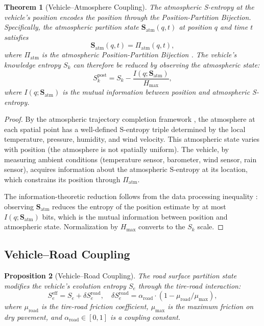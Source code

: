 \documentclass[twocolumn,10pt]{article}
\newtheorem{theorem}{Theorem}[section]
\newtheorem{proposition}[theorem]{Proposition}
\newcommand{\Sk}{S_k}
\newcommand{\Se}{S_e}
\newcommand{\Hmax}{H_{\mathrm{max}}}
\begin{document}
\begin{theorem}[Vehicle--Atmosphere Coupling]\label{thm:atmosphere}
The atmospheric S-entropy at the vehicle's position encodes the position through the Position-Partition Bijection. Specifically, the atmospheric partition state $\mathbf{S}_{\mathrm{atm}}(q, t)$ at position $q$ and time $t$ satisfies
\begin{equation}
\mathbf{S}_{\mathrm{atm}}(q, t) = \Pi_{\mathrm{atm}}(q, t),
\end{equation}
where $\Pi_{\mathrm{atm}}$ is the atmospheric Position-Partition Bijection \cite{sachikonye2026atmospheric}. The vehicle's knowledge entropy $\Sk$ can therefore be reduced by observing the atmospheric state:
\begin{equation}
\Sk^{\mathrm{post}} = \Sk - \frac{I(q; \mathbf{S}_{\mathrm{atm}})}{\Hmax},
\end{equation}
where $I(q; \mathbf{S}_{\mathrm{atm}})$ is the mutual information between position and atmospheric S-entropy.
\end{theorem}

\begin{proof}
By the atmospheric trajectory completion framework \cite{sachikonye2026atmospheric}, the atmosphere at each spatial point has a well-defined S-entropy triple determined by the local temperature, pressure, humidity, and wind velocity. This atmospheric state varies with position (the atmosphere is not spatially uniform). The vehicle, by measuring ambient conditions (temperature sensor, barometer, wind sensor, rain sensor), acquires information about the atmospheric S-entropy at its location, which constrains its position through $\Pi_{\mathrm{atm}}$.

The information-theoretic reduction follows from the data processing inequality \cite{cover2006}: observing $\mathbf{S}_{\mathrm{atm}}$ reduces the entropy of the position estimate by at most $I(q; \mathbf{S}_{\mathrm{atm}})$ bits, which is the mutual information between position and atmospheric state. Normalization by $\Hmax$ converts to the $\Sk$ scale.
\end{proof}

\subsection{Vehicle--Road Coupling}

\begin{proposition}[Vehicle--Road Coupling]\label{prop:road_coupling}
The road surface partition state modifies the vehicle's evolution entropy $\Se$ through the tire-road interaction:
\begin{equation}
\Se^{\mathrm{eff}} = \Se + \delta \Se^{\mathrm{road}}, \quad \delta \Se^{\mathrm{road}} = \alpha_{\mathrm{road}} \cdot (1 - \mu_{\mathrm{road}} / \mu_{\mathrm{max}}),
\end{equation}
where $\mu_{\mathrm{road}}$ is the tire-road friction coefficient, $\mu_{\mathrm{max}}$ is the maximum friction on dry pavement, and $\alpha_{\mathrm{road}} \in [0,1]$ is a coupling constant.
\end{proposition}
\end{document}
